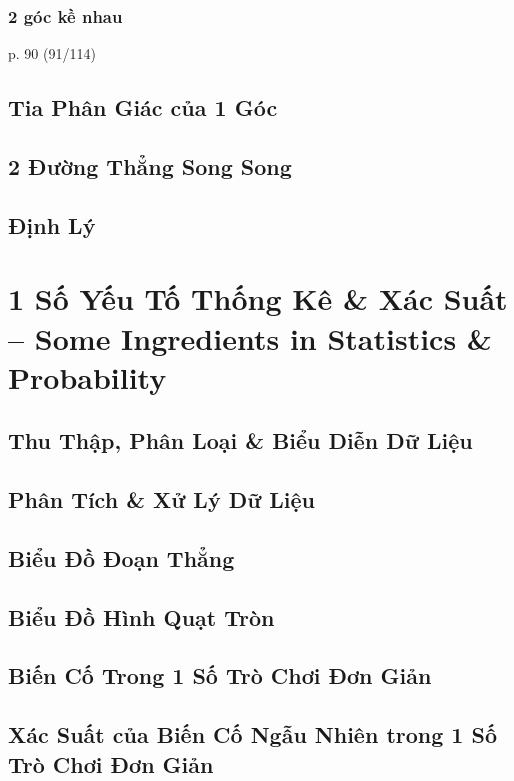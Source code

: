 \documentclass[oneside]{book}
\numberwithin{equation}{section}
\begin{document}
\subsection{2 góc kề nhau}
p. 90 (91/114)

\section{Tia Phân Giác của 1 Góc}

\section{2 Đường Thẳng Song Song}

\section{Định Lý}


\chapter{1 Số Yếu Tố Thống Kê \& Xác Suất -- Some Ingredients in Statistics \& Probability}

\section{Thu Thập, Phân Loại \& Biểu Diễn Dữ Liệu}

\section{Phân Tích \& Xử Lý Dữ Liệu}

\section{Biểu Đồ Đoạn Thẳng}

\section{Biểu Đồ Hình Quạt Tròn}

\section{Biến Cố Trong 1 Số Trò Chơi Đơn Giản}

\section{Xác Suất của Biến Cố Ngẫu Nhiên trong 1 Số Trò Chơi Đơn Giản}
\end{document}
